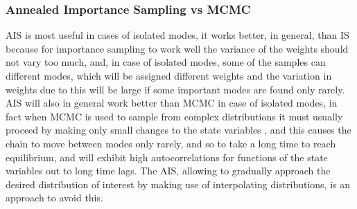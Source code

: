 \documentclass[12pt,mythesisstyle]{report}
\begin{document}
\subsubsection{Annealed Importance Sampling vs MCMC}
AIS is most useful in cases of isolated modes, it works better, in general, than IS because for importance sampling to work well the variance of the weights should not vary too much, and, in case of isolated modes, some of the samples can different modes, which will be assigned different weights and the variation in weights due to this will be large if some important modes are found only rarely. AIS will also in general work better than MCMC in case of isolated modes, in fact when MCMC is used to sample from complex distributions it must usually proceed by making only small changes to the state variables \cite{annealedis}, and this causes the chain to move between modes only rarely, and so to take a long time to reach equilibrium, and will exhibit high autocorrelations for functions of the state variables out to long time lags. The AIS, allowing to gradually approach the desired distribution of interest by making use of interpolating distributions, is an approach to avoid this.
\end{document}

